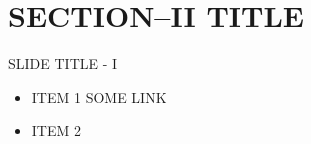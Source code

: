 


\maketitle
\section{SECTION--II TITLE}
\begin{frame}[t]{SLIDE TITLE - I}
	\begin{itemize}
		\item ITEM 1
		SOME LINK
		\item ITEM 2
	\end{itemize}
	
\end{frame}



